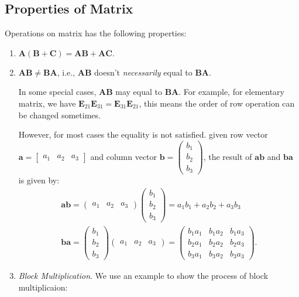 \subsection{Properties of Matrix}
Operations on matrix has the following properties:
\begin{enumerate}
\item
$\bm A(\bm B+\bm C)=\bm{AB}+\bm{AC}.$
\item
$\bm{AB}\ne\bm{BA}$, i.e., $\bm{AB}$ doesn’t \textit{necessarily} equal to $\bm{BA}$.
\begin{remark}
In some special cases, $\bm{AB}$ may equal to $\bm{BA}$. For example, for elementary matrix, we have $\bm E_{21}\bm E_{31}=\bm E_{31}\bm E_{21}$, this means the order of row operation can be changed sometimes.

However, for most cases the equality is not satisfied. given row vector $\bm a=\begin{bmatrix}
a_1&a_2&a_3
\end{bmatrix}$ and column vector $\bm b=\begin{pmatrix}
b_1\\b_2\\b_3
\end{pmatrix}$, the result of $\bm{ab}$ and $\bm{ba}$ is given by:
\begin{gather*}
\bm{ab}=\begin{pmatrix}
a_1&a_2&a_3
\end{pmatrix}\begin{pmatrix}
b_1\\b_2\\b_3
\end{pmatrix}=a_1b_1+a_2b_2+a_3b_3\\
\bm{ba}=\begin{pmatrix}
b_1\\b_2\\b_3
\end{pmatrix}\begin{pmatrix}
a_1&a_2&a_3
\end{pmatrix}=\begin{pmatrix}
b_1a_1&b_1a_2&b_1a_3\\
b_2a_1&b_2a_2&b_2a_3\\
b_3a_1&b_3a_2&b_3a_3
\end{pmatrix}.
\end{gather*}
\end{remark}
\item
\emph{Block Multiplication}. We use an example to show the process of block multiplicaion:
\begin{example}

\end{example}
\end{enumerate}
